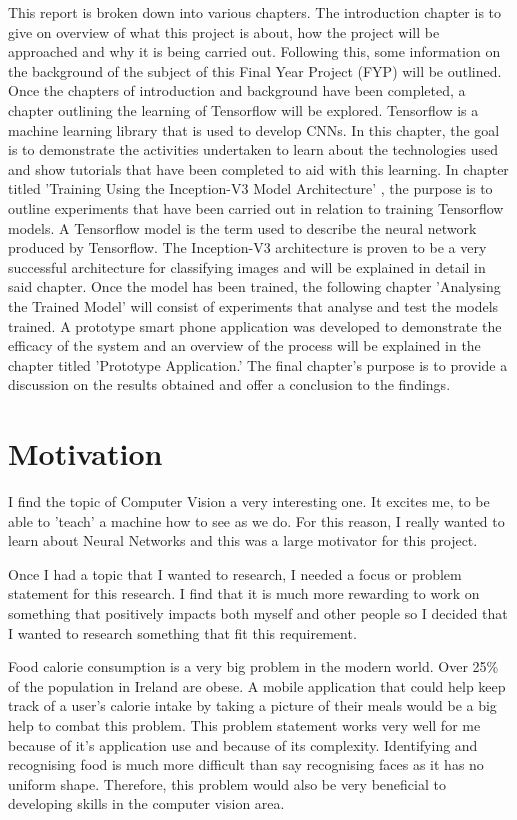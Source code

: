 This report is broken down into various chapters.
The introduction chapter is to give on overview of what this project is about, how the project will be approached and why it is being carried out.
Following this, some information on the background of the subject of this Final Year Project (FYP) will be outlined. Once the chapters of introduction and background have been completed, a chapter outlining the learning of Tensorflow will be explored. Tensorflow is a machine learning library that is used to develop CNNs. In this chapter, the goal is to demonstrate the activities undertaken to learn about the technologies used and show tutorials that have been completed to aid with this learning.
In chapter titled 'Training Using the Inception-V3 Model Architecture' , the purpose is to outline experiments that have been carried out in relation to training Tensorflow models.
A Tensorflow model is the term used to describe the neural network produced by Tensorflow. 
The Inception-V3 architecture is proven to be a very successful architecture for classifying images and will be explained in detail in said chapter.
Once the model has been trained, the following chapter 'Analysing the Trained Model' will consist of experiments that analyse and test the models trained.
A prototype smart phone application was developed to demonstrate the efficacy of the system and an overview of the process will be explained in the chapter titled 'Prototype Application.'
The final chapter's purpose is to provide a discussion on the results obtained and offer a conclusion to the findings.

\section{Motivation}
I find the topic of Computer Vision a very interesting one.
It excites me, to be able to 'teach' a machine how to see as we do.
For this reason, I really wanted to learn about Neural Networks
and this was a large motivator for this project.

Once I had a topic that I wanted to research, I needed a focus or problem statement for this research.
I find that it is much more rewarding to work on something that positively
impacts both myself and other people so I decided that I wanted to research
something that fit this requirement.

Food calorie consumption is a very big problem in the modern world.
Over 25\% of the population in Ireland are obese.
A mobile application that could help keep track of a user's calorie intake by taking a picture of their meals would be a big help to combat this problem.
This problem statement works very well for me because of it's application use and because of its complexity.
Identifying and recognising food is much more difficult than say recognising faces as it has no uniform shape.
Therefore, this problem would also be very beneficial to developing skills in the computer vision area.

